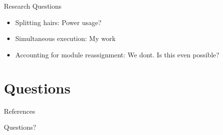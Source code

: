 \documentclass{beamer}
\begin{document}
\begin{frame}{Research Questions}
\begin{itemize}
	\item Splitting hairs: Power usage?
	\item Simultaneous execution: My work
	\item Accounting for module reassignment: We dont. Is this even possible?
\end{itemize}
\end{frame}

\section{Questions}
\begin{frame}[allowframebreaks]{References}


\end{frame}

\begin{frame}{Questions?}
\end{frame}
\end{document}
